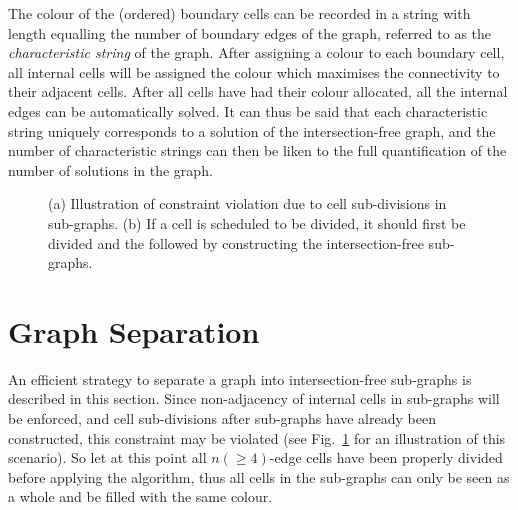 \documentclass[journal]{IEEEtran}
\begin{document}
The colour of the (ordered) boundary cells can be recorded in a string with length equalling the number of boundary edges of the graph, referred to as 
the \textit{characteristic string} of the graph. After assigning a colour to each boundary cell, all internal cells will be assigned the colour which maximises 
the connectivity to their adjacent cells. 
After all cells have had their colour allocated, all the internal edges can be  automatically solved. 
It can thus be said that each characteristic string uniquely corresponds to a solution of the intersection-free graph, 
and the number of characteristic strings can then be liken to the full quantification of the number of solutions in the graph. 
\begin{figure}[t]
\centering
{}
\caption{(a) Illustration of constraint violation due to cell sub-divisions in sub-graphs. (b) If a cell is scheduled to be divided, it should first be divided and the followed by  constructing the intersection-free sub-graphs.}
\label{fig:constraint_violation}
\end{figure}

\section{Graph Separation}
\label{section_graph_separation}
 An efficient strategy to separate a graph into intersection-free sub-graphs is described in this section. 
Since non-adjacency of internal cells in sub-graphs will be enforced, and cell sub-divisions after sub-graphs have already been constructed, 
this constraint may be violated (see Fig.~\ref{fig:constraint_violation} for an illustration of this scenario).
So let at this point all $n(\geq 4)$-edge cells have been properly divided before applying the algorithm, 
thus all cells in the sub-graphs can only be seen as a whole and be filled with the same colour. 
\end{document}

